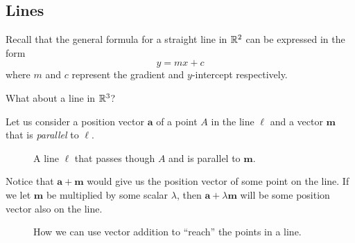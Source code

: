 \documentclass[12pt]{article}
\renewcommand{\vec}{\mathbf}
\begin{document}
\subsection{Lines}
\begin{disc}
	Recall that the general formula for a straight line in \(\mathbb{R}^2\) can be expressed in the form
	\[ y = mx + c \] 
	where \(m\) and \(c\) represent the gradient and \(y\)-intercept respectively.

	What about a line in \(\mathbb{R}^3\)?

	Let us consider a position vector \(\vec{a}\) of a point \(A\) in the line \(\ell\) and a vector \(\vec{m}\) that is \emph{parallel} to \(\ell\).

	\begin{figure}[H]
		\centering
		\caption{A line \(\ell\) that passes though \(A\) and is parallel to \(\vec{m}\).}
	\end{figure}

	Notice that \(\vec{a} + \vec{m}\) would give us the position vector of some point on the line. 
	If we let \(\vec{m}\) be multiplied by some scalar \(\lambda\), then \(\vec{a} + \lambda \vec{m}\) will be some position vector also on the line.

	\begin{figure}[H]
		\centering
		\caption{How we can use vector addition to ``reach'' the points in a line.}
	\end{figure}


\end{disc}
\end{document}
